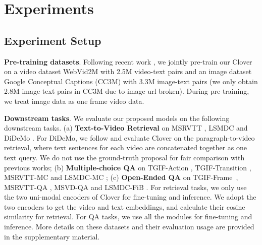 \documentclass[10pt,twocolumn,letterpaper]{article}
\begin{document}
{\section{Experiments}
\subsection{Experiment Setup}
\noindent  \textbf{Pre-training datasets}.
Following recent work \cite{bain2021frozen, li2022alignandprompt, ge2022bridging}, we jointly pre-train our Clover on a video dataset WebVid2M \cite{bain2021frozen} with 2.5M video-text pairs and an image dataset Google Conceptual Captions (CC3M) \cite{sharma2018conceptual} with 3.3M image-text pairs (we only obtain 2.8M image-text pairs in CC3M due to image url broken). During pre-training, we treat image data as one frame video data.

\noindent  \textbf{Downstream tasks}. We evaluate our proposed models on the following downstream tasks. (a) \textbf{Text-to-Video Retrieval} on MSRVTT \cite{xu2016msr}, LSMDC  \cite{maharaj2017dataset} and DiDeMo \cite{anne2017localizing}. For DiDeMo, we follow \cite{lei2021less, liu2019use} and evaluate Clover on the paragraph-to-video retrieval, where text sentences for each video are concatenated together as one text query. We do not use the ground-truth proposal for fair comparison with previous works;  (b) \textbf{Multiple-choice QA} on TGIF-Action \cite{jang2017tgif},  TGIF-Transition \cite{jang2017tgif}, MSRVTT-MC \cite{yu2018joint} and LSMDC-MC \cite{torabi2016learning}; (c) \textbf{Open-Ended QA} on TGIF-Frame~\cite{jang2017tgif}, MSRVTT-QA \cite{xu2017video}, MSVD-QA \cite{xu2017video} and LSMDC-FiB \cite{maharaj2017dataset}. For retrieval tasks, we only use the two uni-modal encoders of Clover for fine-tuning and inference. We adopt the two encoders to get the video and text embeddings, and calculate their cosine similarity for retrieval. For QA tasks, we use all the modules for fine-tuning and inference. More details on these datasets and their evaluation usage are provided in the 
supplementary material. 


}
\end{document}
